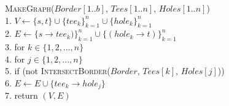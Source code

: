 \documentclass{article}
\begin{document}
\begin{enumerate}
\begin{algorithm}
        \textsc{MakeGraph}($Border[1..b]$, $Tees[1..n]$, $Holes[1..n]$) \\
        1. \hspace{1em} $V \gets \{ s, t \} \cup \{ tee_k \}_{k=1}^n \cup \{ hole_k \} _{k=1}^n$ \\
        2. \hspace{1em} $E \gets \{ s \to tee_k) \} _{k=1}^n \cup \{ (hole_k \to t) \} _{k=1}^n $ \\
        3. \hspace{1em} for $k \in \{ 1, 2, ..., n \} $ \\
        4. \hspace{2em}     for $j \in \{ 1, 2, ..., n \} $ \\
        5. \hspace{3em}         if (not \textsc{IntersectBorder}($Border$, $Tees[k]$, $Holes[j]$)) \\
        6. \hspace{4em}             $E \gets E \cup \{ tee_k \to hole_j \}$ \\
        7. \hspace{1em} return $(V, E)$ \\\\


\end{algorithm}
\end{enumerate}
\end{document}
